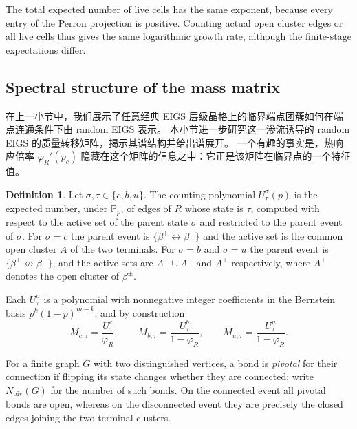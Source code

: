 \documentclass[scheme=plain,11pt]{ctexart}
\theoremstyle{definition}
\newtheorem{definition}[theorem]{Definition}
\theoremstyle{remark}
\begin{document}
The total expected number of live cells has the same exponent, because every entry of the Perron projection is positive.
Counting actual open cluster edges or all live cells thus gives the same logarithmic growth rate, although the finite-stage expectations differ.












\subsection{Spectral structure of the mass matrix}\label{sec:live-matrix}

在上一小节中，我们展示了任意经典 EIGS 层级晶格上的临界端点团簇如何在端点连通条件下由 random EIGS 表示。
本小节进一步研究这一渗流诱导的 random EIGS 的质量转移矩阵，揭示其谱结构并给出谱展开。
一个有趣的事实是，热响应倍率 $\varphi_R'(p_c)$ 隐藏在这个矩阵的信息之中：它正是该矩阵在临界点的一个特征值。

\begin{definition}\label{def:counting-polynomials}
Let $\sigma,\tau\in\{c,b,u\}$.
The counting polynomial $U^{\sigma}_{\tau}(p)$ is the expected number, under $\mathbb P_p$, of edges of $R$ whose state is $\tau$, computed with respect to the active set of the parent state $\sigma$ and restricted to the parent event of $\sigma$.
For $\sigma=c$ the parent event is $\{\beta^+\leftrightarrow\beta^-\}$ and the active set is the common open cluster $A$ of the two terminals.
For $\sigma=b$ and $\sigma=u$ the parent event is $\{\beta^+\nleftrightarrow\beta^-\}$, and the active sets are $A^{+}\cup A^{-}$ and $A^{+}$ respectively, where $A^{\pm}$ denotes the open cluster of $\beta^{\pm}$.
\end{definition}

Each $U^{\sigma}_{\tau}$ is a polynomial with nonnegative integer coefficients in the Bernstein basis $p^{k}(1-p)^{m-k}$, and by construction
\[
   M_{c,\tau}=\frac{U^{c}_{\tau}}{\varphi_R},
   \qquad
   M_{b,\tau}=\frac{U^{b}_{\tau}}{1-\varphi_R},
   \qquad
   M_{u,\tau}=\frac{U^{u}_{\tau}}{1-\varphi_R}.
\]

For a finite graph $G$ with two distinguished vertices, a bond is \emph{pivotal} for their connection if flipping its state changes whether they are connected; write $N_{\mathrm{piv}}(G)$ for the number of such bonds.
On the connected event all pivotal bonds are open, whereas on the disconnected event they are precisely the closed edges joining the two terminal clusters.
\end{document}
